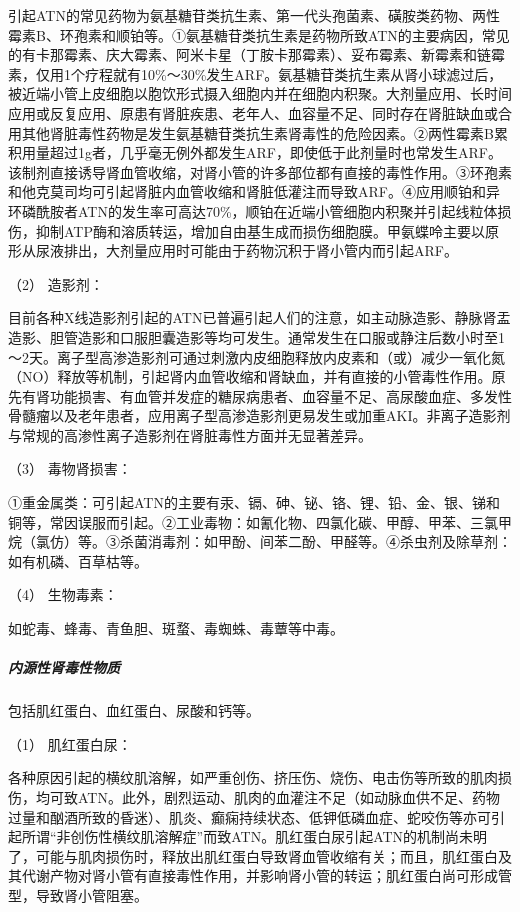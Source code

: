 引起ATN的常见药物为氨基糖苷类抗生素、第一代头孢菌素、磺胺类药物、两性霉素B、环孢素和顺铂等。①氨基糖苷类抗生素是药物所致ATN的主要病因，常见的有卡那霉素、庆大霉素、阿米卡星（丁胺卡那霉素）、妥布霉素、新霉素和链霉素，仅用1个疗程就有10\%～30\%发生ARF。氨基糖苷类抗生素从肾小球滤过后，被近端小管上皮细胞以胞饮形式摄入细胞内并在细胞内积聚。大剂量应用、长时间应用或反复应用、原患有肾脏疾患、老年人、血容量不足、同时存在肾脏缺血或合用其他肾脏毒性药物是发生氨基糖苷类抗生素肾毒性的危险因素。②两性霉素B累积用量超过1g者，几乎毫无例外都发生ARF，即使低于此剂量时也常发生ARF。该制剂直接诱导肾血管收缩，对肾小管的许多部位都有直接的毒性作用。③环孢素和他克莫司均可引起肾脏内血管收缩和肾脏低灌注而导致ARF。④应用顺铂和异环磷酰胺者ATN的发生率可高达70\%，顺铂在近端小管细胞内积聚并引起线粒体损伤，抑制ATP酶和溶质转运，增加自由基生成而损伤细胞膜。甲氨蝶呤主要以原形从尿液排出，大剂量应用时可能由于药物沉积于肾小管内而引起ARF。

\hypertarget{text00083.htmlux5cux23CHP3-7-4-1-2-1-2}{}
（2） 造影剂：

目前各种X线造影剂引起的ATN已普遍引起人们的注意，如主动脉造影、静脉肾盂造影、胆管造影和口服胆囊造影等均可发生。通常发生在口服或静注后数小时至1～2天。离子型高渗造影剂可通过刺激内皮细胞释放内皮素和（或）减少一氧化氮（NO）释放等机制，引起肾内血管收缩和肾缺血，并有直接的小管毒性作用。原先有肾功能损害、有血管并发症的糖尿病患者、血容量不足、高尿酸血症、多发性骨髓瘤以及老年患者，应用离子型高渗造影剂更易发生或加重AKI。非离子造影剂与常规的高渗性离子造影剂在肾脏毒性方面并无显著差异。

\hypertarget{text00083.htmlux5cux23CHP3-7-4-1-2-1-3}{}
（3） 毒物肾损害：

①重金属类：可引起ATN的主要有汞、镉、砷、铋、铬、锂、铅、金、银、锑和铜等，常因误服而引起。②工业毒物：如氰化物、四氯化碳、甲醇、甲苯、三氯甲烷（氯仿）等。③杀菌消毒剂：如甲酚、间苯二酚、甲醛等。④杀虫剂及除草剂：如有机磷、百草枯等。

\hypertarget{text00083.htmlux5cux23CHP3-7-4-1-2-1-4}{}
（4） 生物毒素：

如蛇毒、蜂毒、青鱼胆、斑蝥、毒蜘蛛、毒蕈等中毒。

\subparagraph{内源性肾毒性物质}

包括肌红蛋白、血红蛋白、尿酸和钙等。

\hypertarget{text00083.htmlux5cux23CHP3-7-4-1-2-2-1}{}
（1） 肌红蛋白尿：

各种原因引起的横纹肌溶解，如严重创伤、挤压伤、烧伤、电击伤等所致的肌肉损伤，均可致ATN。此外，剧烈运动、肌肉的血灌注不足（如动脉血供不足、药物过量和酗酒所致的昏迷）、肌炎、癫痫持续状态、低钾低磷血症、蛇咬伤等亦可引起所谓“非创伤性横纹肌溶解症”而致ATN。肌红蛋白尿引起ATN的机制尚未明了，可能与肌肉损伤时，释放出肌红蛋白导致肾血管收缩有关；而且，肌红蛋白及其代谢产物对肾小管有直接毒性作用，并影响肾小管的转运；肌红蛋白尚可形成管型，导致肾小管阻塞。

